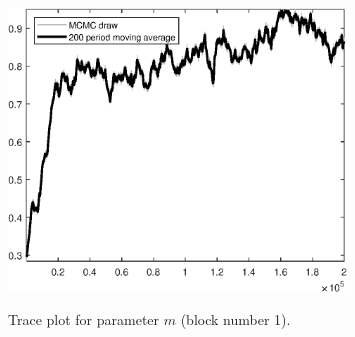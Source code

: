 \begin{figure}[H]
\centering
  \includegraphics[width=0.8\textwidth]{BRS_sectoral_rest/graphs/TracePlot_m_blck_1}\\
    \caption{Trace plot for parameter ${m}$ (block number 1).}
\end{figure}
